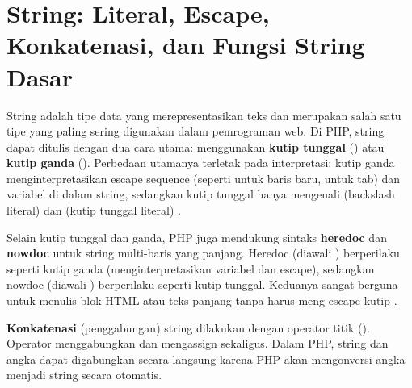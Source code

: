 ﻿\section{String: Literal, Escape, Konkatenasi, dan Fungsi String Dasar}

String adalah tipe data yang merepresentasikan teks dan merupakan salah satu tipe yang paling sering digunakan dalam pemrograman web. Di PHP, string dapat ditulis dengan dua cara utama: menggunakan \textbf{kutip tunggal} () atau \textbf{kutip ganda} (). Perbedaan utamanya terletak pada interpretasi: kutip ganda menginterpretasikan escape sequence (seperti  untuk baris baru,  untuk tab) dan variabel di dalam string, sedangkan kutip tunggal hanya mengenali \code{\textbackslash\textbackslash} (backslash literal) dan  (kutip tunggal literal) \cite{phpManual}.

Selain kutip tunggal dan ganda, PHP juga mendukung sintaks \textbf{heredoc} dan \textbf{nowdoc} untuk string multi-baris yang panjang. Heredoc (diawali ) berperilaku seperti kutip ganda (menginterpretasikan variabel dan escape), sedangkan nowdoc (diawali ) berperilaku seperti kutip tunggal. Keduanya sangat berguna untuk menulis blok HTML atau teks panjang tanpa harus meng-escape kutip \cite{phpManual}.


\textbf{Konkatenasi} (penggabungan) string dilakukan dengan operator titik (). Operator  menggabungkan dan mengassign sekaligus. Dalam PHP, string dan angka dapat digabungkan secara langsung karena PHP akan mengonversi angka menjadi string secara otomatis.

